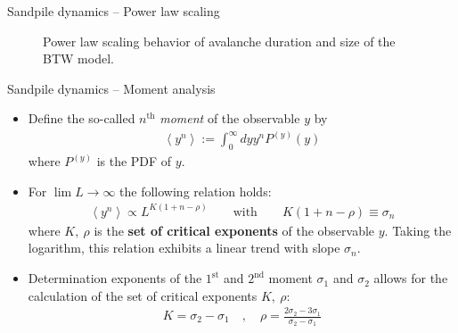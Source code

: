 \documentclass[xcolor=dvipsnames]{beamer}
\newcommand{\myitemsep}{\setlength\itemsep{0.33cm}}
\begin{document}
	\begin{frame}{Sandpile dynamics -- Power law scaling}
		\begin{figure}[h]
			\captionsetup{width=0.9\textwidth}
			\begin{center}
				\caption{Power law scaling behavior of avalanche duration and size of the BTW model.}
			\end{center}
		\end{figure}
	\end{frame}
	
	\begin{frame}{Sandpile dynamics -- Moment analysis}
		\begin{itemize}
			\myitemsep
			\item {Define the so-called $n^{\mathrm{th}}$ \textit{moment} of the observable $y$ by
				\begin{align*}
				\left\langle y^n \right\rangle := \int_{0}^{\infty} dy y^n P^{(y)}(y)
				\end{align*}
				where $P^{(y)}$ is the PDF of $y$.
				}
			\item {For $\lim{L \to \infty}$ the following relation holds:
				\begin{align*}
				\left\langle y^n \right\rangle \propto L^{K\left(1 + n - \rho \right)} \qquad \text{with} \qquad K\left(1 + n - \rho \right) \equiv \sigma_n 
				\end{align*}
				where  $K,\ \rho$ is the \textbf{set of critical exponents} of the observable $y$. Taking the logarithm, this relation exhibits a linear trend with slope $\sigma_n$.
				}
			\item {Determination exponents of the $1^{\text{st}}$ and $2^{\text{nd}}$ moment $\sigma_1$ and $\sigma_2$ allows for the calculation of the set of critical exponents $K,\ \rho$:
				\begin{align*}
				K = \sigma_2 - \sigma_1 \quad , \quad \rho = \frac{2\sigma_2 - 3\sigma_1}{\sigma_2 - \sigma_1} 
				\end{align*} 
				}
		\end{itemize}
	\end{frame}
	
\end{document}
